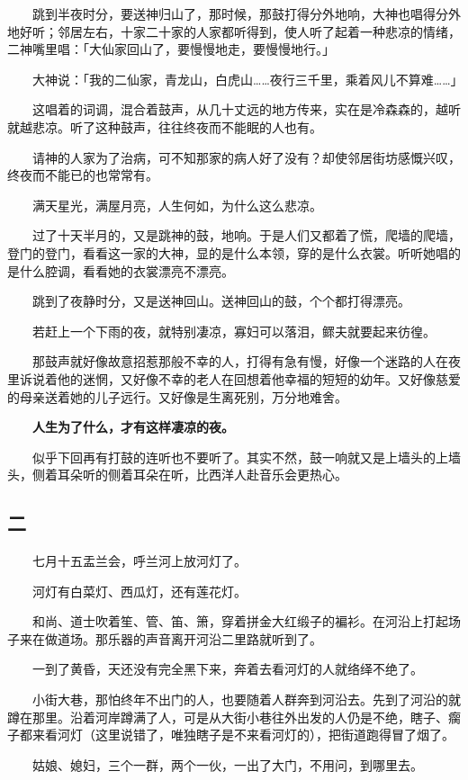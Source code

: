 \documentclass[UTF8]{ctexart}
\begin{document}
　　跳到半夜时分，要送神归山了，那时候，那鼓打得分外地响，大神也唱得分外地好听；邻居左右，十家二十家的人家都听得到，使人听了起着一种悲凉的情绪，二神嘴里唱：「大仙家回山了，要慢慢地走，要慢慢地行。」

　　大神说：「我的二仙家，青龙山，白虎山……夜行三千里，乘着风儿不算难……」

　　这唱着的词调，混合着鼓声，从几十丈远的地方传来，实在是冷森森的，越听就越悲凉。听了这种鼓声，往往终夜而不能眠的人也有。

　　请神的人家为了治病，可不知那家的病人好了没有？却使邻居街坊感慨兴叹，终夜而不能已的也常常有。

　　满天星光，满屋月亮，人生何如，为什么这么悲凉。

　　过了十天半月的，又是跳神的鼓，地响。于是人们又都着了慌，爬墙的爬墙，登门的登门，看看这一家的大神，显的是什么本领，穿的是什么衣裳。听听她唱的是什么腔调，看看她的衣裳漂亮不漂亮。

　　跳到了夜静时分，又是送神回山。送神回山的鼓，个个都打得漂亮。

　　若赶上一个下雨的夜，就特别凄凉，寡妇可以落泪，鳏夫就要起来彷徨。

　　那鼓声就好像故意招惹那般不幸的人，打得有急有慢，好像一个迷路的人在夜里诉说着他的迷惘，又好像不幸的老人在回想着他幸福的短短的幼年。又好像慈爱的母亲送着她的儿子远行。又好像是生离死别，万分地难舍。

　　\textbf{人生为了什么，才有这样凄凉的夜。}

　　似乎下回再有打鼓的连听也不要听了。其实不然，鼓一响就又是上墙头的上墙头，侧着耳朵听的侧着耳朵在听，比西洋人赴音乐会更热心。

\subsection{二}

　　七月十五盂兰会，呼兰河上放河灯了。

　　河灯有白菜灯、西瓜灯，还有莲花灯。

　　和尚、道士吹着笙、管、笛、箫，穿着拼金大红缎子的褊衫。在河沿上打起场子来在做道场。那乐器的声音离开河沿二里路就听到了。

　　一到了黄昏，天还没有完全黑下来，奔着去看河灯的人就络绎不绝了。

　　小街大巷，那怕终年不出门的人，也要随着人群奔到河沿去。先到了河沿的就蹲在那里。沿着河岸蹲满了人，可是从大街小巷往外出发的人仍是不绝，瞎子、瘸子都来看河灯（这里说错了，唯独瞎子是不来看河灯的），把街道跑得冒了烟了。

　　姑娘、媳妇，三个一群，两个一伙，一出了大门，不用问，到哪里去。
\end{document}
